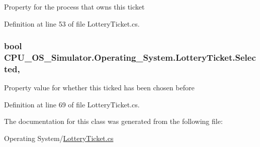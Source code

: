 Property for the process that owns this ticket 



Definition at line 53 of file Lottery\+Ticket.\+cs.

\hypertarget{class_c_p_u___o_s___simulator_1_1_operating___system_1_1_lottery_ticket_aedda5be8ac6feb49a7a140af4e99a7ad}{}
\subsubsection[{Selected}]{\setlength{\rightskip}{0pt plus 5cm}bool C\+P\+U\+\_\+\+O\+S\+\_\+\+Simulator.\+Operating\+\_\+\+System.\+Lottery\+Ticket.\+Selected\hspace{0.3cm}{\ttfamily [get]}, {\ttfamily [set]}}\label{class_c_p_u___o_s___simulator_1_1_operating___system_1_1_lottery_ticket_aedda5be8ac6feb49a7a140af4e99a7ad}


Property value for whether this ticked has been chosen before 



Definition at line 69 of file Lottery\+Ticket.\+cs.



The documentation for this class was generated from the following file\+:\begin{DoxyCompactItemize}
\item 
Operating System/\hyperlink{_lottery_ticket_8cs}{Lottery\+Ticket.\+cs}\end{DoxyCompactItemize}
